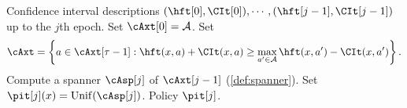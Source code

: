 \begin{algorithm}
\begin{algorithmic}
\REQUIRE Confidence interval descriptions $(\hft[0], \CIt[0]),\cdots,(\hft[j-1],\CIt[j-1])$ up to the $j$th epoch.
\STATE Set $\cAxt[0]=\cA$.
\STATE Set
\begin{align}\label{eq:eliminate}
    \cAxt=\sset{ a\in\cAxt[\tau-1]: \hft(x,a)+\CIt(x,a)\geq \max_{a'\in\cA}\hft(x,a')-\CIt(x,a') }.
\end{align}
\ENDFOR
\STATE Compute a spanner $\cAsp[j]$ of $\cAxt[j-1]$ (\cref{def:spanner}).
\STATE Set $\pit[j](x)=\Unif(\cAsp[j])$.
\ENDFOR
\ENSURE Policy $\pit[j]$.
\end{algorithmic}
\caption{Subroutine $\AlgPlan$ %
}\label{alg:plan}
\end{algorithm}
